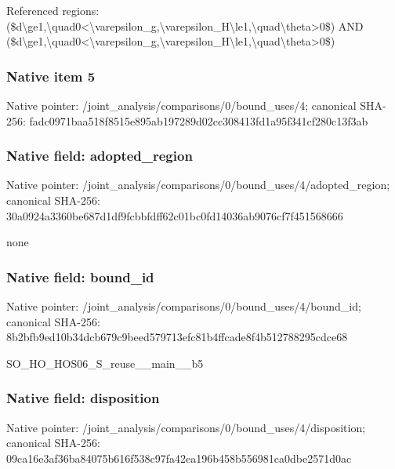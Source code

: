 \documentclass[10pt,a4paper]{article}
\begin{document}
\begingroup\raggedright\sloppy Referenced regions:\allowbreak{} (\$d\textbackslash{}ge1,\allowbreak{}\textbackslash{}quad0<\textbackslash{}varepsilon\_\allowbreak{}g,\allowbreak{}\textbackslash{}varepsilon\_\allowbreak{}H\textbackslash{}le1,\allowbreak{}\textbackslash{}quad\textbackslash{}theta>0\$) AND (\$d\textbackslash{}ge1,\allowbreak{}\textbackslash{}quad0<\textbackslash{}varepsilon\_\allowbreak{}g,\allowbreak{}\textbackslash{}varepsilon\_\allowbreak{}H\textbackslash{}le1,\allowbreak{}\textbackslash{}quad\textbackslash{}theta>0\$)\par\endgroup

\subsubsection{Native item 5}
Native pointer: /joint\_\allowbreak{}analysis/comparisons/0/bound\_\allowbreak{}uses/4; canonical SHA-256: fadc0971baa518f8515e895ab197289d02cc308413fd1a95f341cf280c13f3ab

\subsubsection{Native field: adopted\_\allowbreak{}region}
Native pointer: /joint\_\allowbreak{}analysis/comparisons/0/bound\_\allowbreak{}uses/4/adopted\_\allowbreak{}region; canonical SHA-256: 30a0924a3360be687d1df9fcbbfdff62c01bc0fd14036ab9076cf7f451568666

\begingroup\raggedright\sloppy none\par\endgroup

\subsubsection{Native field: bound\_\allowbreak{}id}
Native pointer: /joint\_\allowbreak{}analysis/comparisons/0/bound\_\allowbreak{}uses/4/bound\_\allowbreak{}id; canonical SHA-256: 8b2bfb9ed10b34dcb679c9beed579713efc81b4ffcade8f4b512788295cdce68

\begingroup\raggedright\sloppy SO\_\allowbreak{}HO\_\allowbreak{}HOS06\_\allowbreak{}S\_\allowbreak{}reuse\_\allowbreak{}\_\allowbreak{}main\_\allowbreak{}\_\allowbreak{}b5\par\endgroup

\subsubsection{Native field: disposition}
Native pointer: /joint\_\allowbreak{}analysis/comparisons/0/bound\_\allowbreak{}uses/4/disposition; canonical SHA-256: 09ca16e3af36ba84075b616f538c97fa42ea196b458b556981ca0dbe2571d0ac
\end{document}
